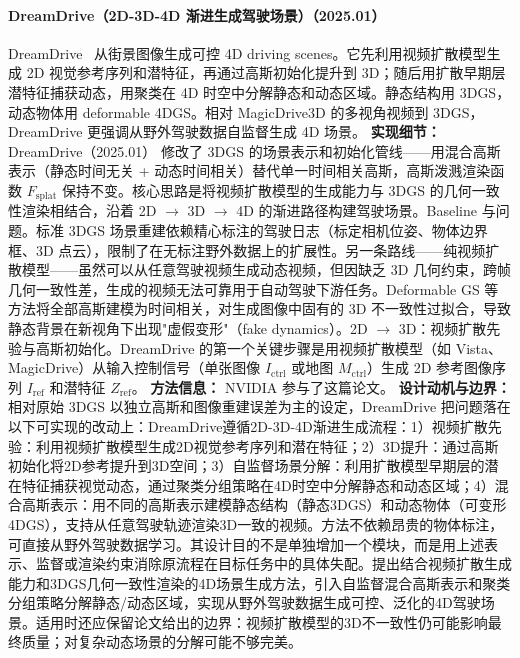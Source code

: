 \paragraph{DreamDrive（2D-3D-4D 渐进生成驾驶场景）（2025.01）}
DreamDrive~\cite{2501_00601} 从街景图像生成可控 4D driving scenes。它先利用视频扩散模型生成 2D 视觉参考序列和潜特征，再通过高斯初始化提升到 3D；随后用扩散早期层潜特征捕获动态，用聚类在 4D 时空中分解静态和动态区域。静态结构用 3DGS，动态物体用 deformable 4DGS。相对 MagicDrive3D 的多视角视频到 3DGS，DreamDrive 更强调从野外驾驶数据自监督生成 4D 场景。
\textbf{实现细节：} DreamDrive（2025.01） 修改了 3DGS 的场景表示和初始化管线——用混合高斯表示（静态时间无关 + 动态时间相关）替代单一时间相关高斯，高斯泼溅渲染函数 $F_\mathrm{splat}$ 保持不变。核心思路是将视频扩散模型的生成能力与 3DGS 的几何一致性渲染相结合，沿着 2D $\to$ 3D $\to$ 4D 的渐进路径构建驾驶场景。Baseline 与问题。标准 3DGS 场景重建依赖精心标注的驾驶日志（标定相机位姿、物体边界框、3D 点云），限制了在无标注野外数据上的扩展性。另一条路线——纯视频扩散模型——虽然可以从任意驾驶视频生成动态视频，但因缺乏 3D 几何约束，跨帧几何一致性差，生成的视频无法可靠用于自动驾驶下游任务。Deformable GS 等方法将全部高斯建模为时间相关，对生成图像中固有的 3D 不一致性过拟合，导致静态背景在新视角下出现"虚假变形"（fake dynamics）。2D $\to$ 3D：视频扩散先验与高斯初始化。DreamDrive 的第一个关键步骤是用视频扩散模型（如 Vista、MagicDrive）从输入控制信号（单张图像 $I_\mathrm{ctrl}$ 或地图 $M_\mathrm{ctrl}$）生成 2D 参考图像序列 $I_\mathrm{ref}$ 和潜特征 $Z_\mathrm{ref}$。
\textbf{方法信息：} NVIDIA 参与了这篇论文。
\textbf{设计动机与边界：} 相对原始 3DGS 以独立高斯和图像重建误差为主的设定，DreamDrive 把问题落在以下可实现的改动上：DreamDrive遵循2D-3D-4D渐进生成流程：1）视频扩散先验：利用视频扩散模型生成2D视觉参考序列和潜在特征；2）3D提升：通过高斯初始化将2D参考提升到3D空间；3）自监督场景分解：利用扩散模型早期层的潜在特征捕获视觉动态，通过聚类分组策略在4D时空中分解静态和动态区域；4）混合高斯表示：用不同的高斯表示建模静态结构（静态3DGS）和动态物体（可变形4DGS），支持从任意驾驶轨迹渲染3D一致的视频。方法不依赖昂贵的物体标注，可直接从野外驾驶数据学习。其设计目的不是单独增加一个模块，而是用上述表示、监督或渲染约束消除原流程在目标任务中的具体失配。提出结合视频扩散生成能力和3DGS几何一致性渲染的4D场景生成方法，引入自监督混合高斯表示和聚类分组策略分解静态/动态区域，实现从野外驾驶数据生成可控、泛化的4D驾驶场景。适用时还应保留论文给出的边界：视频扩散模型的3D不一致性仍可能影响最终质量；对复杂动态场景的分解可能不够完美。
